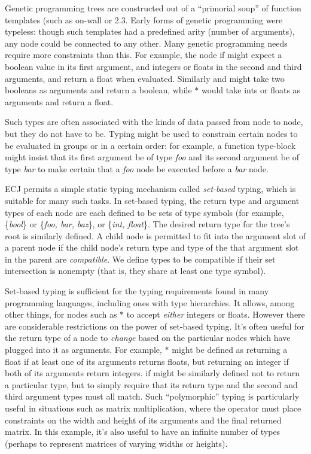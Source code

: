 \documentclass[twoside,10pt]{book}
\newcommand\lisp[1]{\textsf{#1}}
\begin{document}
Genetic programming trees are constructed out of a ``primorial soup'' of function templates (such as \lisp{on-wall} or \lisp{2.3}.  Early forms of genetic programming were typeless: though such templates had a predefined arity (number of arguments), any node could be connected to any other.  Many genetic programming needs require more constraints than this.  For example, the node \lisp{if} might expect a boolean value in its first argument, and integers or floats in the second and third arguments, and return a float when evaluated.  Similarly \lisp{and} might take two booleans as arguments and return a boolean, while \lisp{\(\ast\)} would take ints or floats as arguments and return a float.

Such types are often associated with the kinds of data passed from node to node, but they do not have to be.  Typing might be used to constrain certain nodes to be evaluated in groups or in a certain order: for example, a function \lisp{type-block} might insist that its first argument be of type \textit{foo} and its second argument be of type \textit{bar} to make certain that a \textit{foo} node be executed before a \textit{bar} node.

ECJ permits a simple static typing mechanism called {\it set-based} typing, which is suitable for many such tasks.  In set-based typing, the return type and argument types of each node are each defined to be  sets of type symbols (for example, \{\textit{bool}\} or \{\textit{foo, bar, baz}\}, or \{\textit{int, float}\}.  The desired return type for the tree's root is similarly defined.  A child node is permitted to fit into the argument slot of a parent node if the child node's return type and type of the that argument slot in the parent are {\it compatible}.  We define types to be compatible if their set intersection is nonempty (that is, they share at least one type symbol).

Set-based typing is sufficient for the typing requirements found in many programming languages, including ones with type hierarchies.  It allows, among other things, for nodes such as \lisp{\(\ast\)} to accept {\it either} integers or floats.  However there are considerable restrictions on the power of set-based typing.  It's often useful for the return type of a node to {\it change} based on the particular nodes which have plugged into it as arguments. For example, \lisp{\(\ast\)} might be defined as returning a float if at least one of its arguments returns floats, but returning an integer if both of its arguments return integers.  \lisp{if} might be similarly defined not to return a particular type, but to simply require that its return type and the second and third argument types must all match.  Such ``polymorphic'' typing is particularly useful in situations such as matrix multiplication, where the operator must place constraints on the width and height of its arguments and the final returned matrix.  In this example, it's also useful to have an infinite number of types (perhaps to represent matrices of varying widths or heights).
\end{document}
